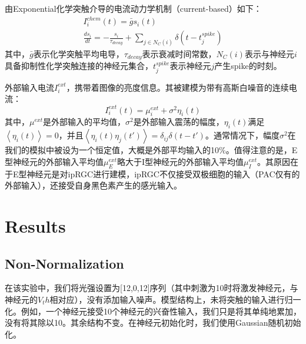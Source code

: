 \documentclass[lang=cn,11pt,a4paper,cite=numbers]{elegantpaper}
\begin{document}
  由Exponential化学突触介导的电流动力学机制（current-based）如下：
\begin{gather}
    I_{i}^{chem}(t) = \bar{g}s_{i}(t) \\
    \frac{ds_{i}}{dt} = -\frac{s_{i}}{\tau_{decay}} + \sum_{j \in N_{C}(i)}\delta(t - t_{j}^{spike})
\end{gather}
其中，$\bar{g}$表示化学突触平均电导，$\tau_{decay}$表示衰减时间常数，$N_{C}(i)$表示与神经元$i$具备抑制性化学突触连接的神经元集合，$t_{j}^{spike}$表示神经元$j$产生spike的时刻。

  外部输入电流$I_{i}^{ext}$，携带着图像的亮度信息。其被建模为带有高斯白噪音的连续电流：
\begin{equation}
    I_{i}^{ext}(t) = \mu_{i}^{ext} + \sigma^{2}\eta_{i}(t)
\end{equation}
其中，$\mu^{ext}$是外部输入的平均值，$\sigma^{2}$是外部输入震荡的幅度，$\eta_{i}(t)$满足$\left\langle\eta_{i}(t)\right\rangle = 0$，并且$\left\langle\eta_{i}(t)\eta_{j}(t')\right\rangle = \delta_{ij}\delta(t - t')$。通常情况下，幅度$\sigma^{2}$在我们的模拟中被设为一个恒定值，大概是外部平均输入的10\%。值得注意的是，E型神经元的外部输入平均值$\mu_{E}^{ext}$略大于I型神经元的外部输入平均值$\mu_{I}^{ext}$。其原因在于E型神经元是对ipRGC进行建模，ipRGC不仅接受双极细胞的输入（PAC仅有的外部输入），还接受自身黑色素产生的感光输入。

\section{Results}
\subsection{Non-Normalization}
  在该实验中，我们将光强设置为[12,0,12]序列（其中刺激为10时将激发神经元，与神经元的$V_th$相对应），没有添加输入噪声。模型结构上，未将突触的输入进行归一化。例如，一个神经元接受10个神经元的兴奋性输入，我们只是将其单纯地累加，没有将其除以10。其余结构不变。在神经元初始化时，我们使用Gaussian随机初始化。
\end{document}
